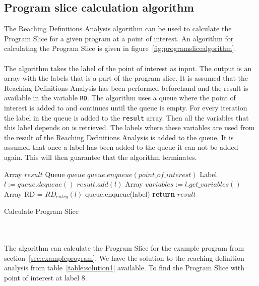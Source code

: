 \subsection{Program slice calculation algorithm}
The Reaching Definitions Analysis algorithm can be used to calculate the Program Slice for a given program at a point of interest. An algorithm for calculating the Program Slice is given in figure~\ref{fig:programslicealgorithm}.
\\
\\
The algorithm takes the label of the point of interest as input. The output is an array with the labels that is a part of the program slice. It is assumed that the Reaching Definitions Analysis has been performed beforehand and the result is available in the variable \texttt{RD}. The algorithm uses a queue where the point of interest is added to and continues until the queue is empty. For every iteration the label in the queue is added to the \texttt{result} array. Then all the variables that this label depends on is retrieved. The labels where these variables are used from the result of the Reaching Definitions Analysis is added to the queue. It is assumed that once a label has been added to the queue it can not be added again. This will then guarantee that the algorithm terminates.
\begin{algorithm}
 \begin{algorithmic}[1]
 \State Array $result$
 \State Queue $queue$
 \State $queue.enqueue(point\_of\_interest)$
 \State Label $l:=queue.dequeue()$
 \State $result.add(l)$
 \State Array $variables:=l.get\_variables()$
 \State Array RD = $RD_{entry}(l)$
\State queue.enqueue(label)
\EndIf 
\EndFor
 \EndWhile
 \State \textbf{return} $result$
 \EndProcedure
 \end{algorithmic}
 \caption{Calculate Program Slice}
 \label{fig:programslicealgorithm}
\end{algorithm}
\\\\
The algorithm can calculate the Program Slice for the example program from section~\ref{sec:exampleprogram}. We have the solution to the reaching definition analysis from table~\ref{table:solution1} available. To find the Program Slice with point of interest at label 8.
